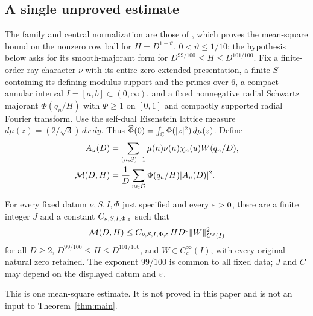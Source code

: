 \subsection{A single unproved estimate}
The family and central normalization are those of \cite[(2.2), Proposition~3.1]{openai2026lm}, which proves the mean-square bound on the nonzero row ball for $H=D^{1+\vartheta}$, $0<\vartheta\le1/10$; the hypothesis below asks for its smooth-majorant form for $D^{99/100}\le H\le D^{101/100}$. Fix a finite-order ray character $\nu$ with its entire zero-extended presentation, a finite $S$ containing its defining-modulus support and the primes over $6$, a compact annular interval $I=[a,b]\subset(0,\infty)$, and a fixed nonnegative radial Schwartz majorant $\Phi(q_u/H)$ with $\Phi\ge1$ on $[0,1]$ and compactly supported radial Fourier transform. Use the self-dual Eisenstein lattice measure $d\mu(z)=(2/\sqrt3)\,dx\,dy$. Thus $\widehat\Phi(0)=\int_{\mathbb C}\Phi(|z|^2)\,d\mu(z)$. Define
\begin{align}
 A_u(D)&=\sum_{(n,S)=1}\mu(n)\nu(n)\chi_n(u)W(q_n/D),\notag\\
 \mathcal M(D,H)&=\frac1D\sum_{u\in\mathcal O}\Phi(q_u/H)|A_u(D)|^2.\label{eq:meanvaluefamily}
\end{align}

\begin{hypothesis}\label{hyp:shortrows}
For every fixed datum $\nu,S,I,\Phi$ just specified and every $\varepsilon>0$, there are a finite integer $J$ and a constant $C_{\nu,S,I,\Phi,\varepsilon}$ such that
\begin{equation}\label{eq:shortrowestimate}
 \mathcal M(D,H)
 \le C_{\nu,S,I,\Phi,\varepsilon}\,H D^\varepsilon\|W\|_{C^J(I)}^2
\end{equation}
for all $D\ge2$, $D^{99/100}\le H\le D^{101/100}$, and $W\in C_c^\infty(I)$, with every original natural zero retained. The exponent $99/100$ is common to all fixed data; $J$ and $C$ may depend on the displayed datum and $\varepsilon$.
\end{hypothesis}

This is one mean-square estimate. It is not proved in this paper and is not an input to Theorem~\ref{thm:main}.

